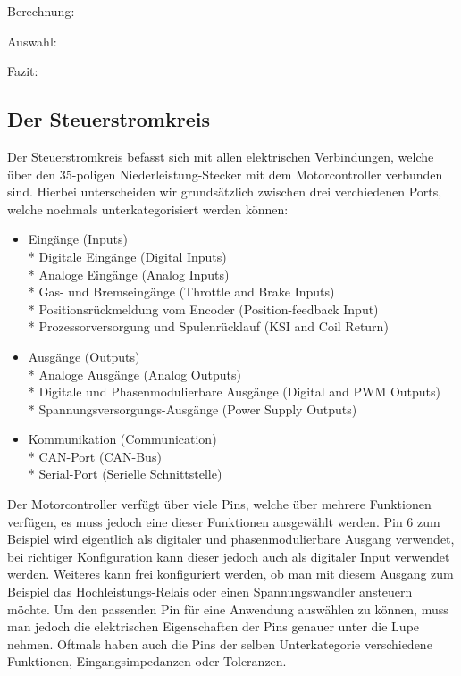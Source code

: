 Berechnung:

Auswahl:

Fazit:

\newpage



\subsection{Der Steuerstromkreis}
Der Steuerstromkreis befasst sich mit allen elektrischen Verbindungen, welche über den  35-poligen Niederleistung-Stecker mit dem Motorcontroller verbunden sind. Hierbei unterscheiden wir grundsätzlich zwischen drei verchiedenen Ports, welche nochmals unterkategorisiert werden können:

\begin{itemize}
	\item Eingänge (Inputs)
	\\ * Digitale Eingänge (Digital Inputs)
	\\ * Analoge Eingänge (Analog Inputs)
	\\ * Gas- und Bremseingänge (Throttle and Brake Inputs)
	\\ * Positionsrückmeldung vom Encoder (Position-feedback Input)
	\\ * Prozessorversorgung und Spulenrücklauf (KSI and Coil Return)
	\item Ausgänge (Outputs)
	\\ * Analoge Ausgänge (Analog Outputs)
	\\ * Digitale und Phasenmodulierbare Ausgänge (Digital and PWM Outputs)
	\\ * Spannungsversorgungs-Ausgänge (Power Supply Outputs)
	\item Kommunikation (Communication)
	\\ * CAN-Port (CAN-Bus)
	\\ * Serial-Port (Serielle Schnittstelle)
\end{itemize}

Der Motorcontroller verfügt über viele Pins, welche über mehrere Funktionen verfügen, es muss jedoch eine dieser Funktionen ausgewählt werden. Pin 6 zum Beispiel wird eigentlich als digitaler und phasenmodulierbare Ausgang verwendet, bei richtiger Konfiguration kann dieser jedoch auch als digitaler Input verwendet werden. Weiteres kann frei konfiguriert werden, ob man mit diesem Ausgang zum Beispiel das Hochleistungs-Relais oder einen Spannungswandler ansteuern möchte. Um den passenden Pin für eine Anwendung auswählen zu können, muss man jedoch die elektrischen Eigenschaften der Pins genauer unter die Lupe nehmen. Oftmals haben auch die Pins der selben Unterkategorie verschiedene Funktionen, Eingangsimpedanzen oder Toleranzen. 

